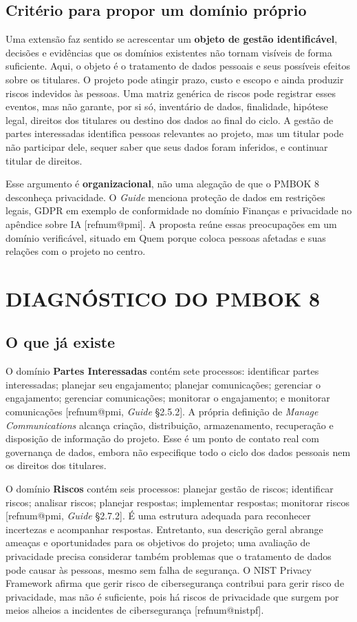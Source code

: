 \documentclass[12pt,a4paper,article,oneside,english,brazil]{abntex2}
\makeatletter
\newcommand{\refnum}[1]{\csname refnum@#1\endcsname}
\makeatother
\begin{document}
\subsection{Critério para propor um domínio próprio}

Uma extensão faz sentido se acrescentar um \textbf{objeto de gestão identificável}, decisões e evidências que os domínios existentes não tornam visíveis de forma suficiente. Aqui, o objeto é o tratamento de dados pessoais e seus possíveis efeitos sobre os titulares. O projeto pode atingir prazo, custo e escopo e ainda produzir riscos indevidos às pessoas. Uma matriz genérica de riscos pode registrar esses eventos, mas não garante, por si só, inventário de dados, finalidade, hipótese legal, direitos dos titulares ou destino dos dados ao final do ciclo. A gestão de partes interessadas identifica pessoas relevantes ao projeto, mas um titular pode não participar dele, sequer saber que seus dados foram inferidos, e continuar titular de direitos.

Esse argumento é \textbf{organizacional}, não uma alegação de que o PMBOK 8 desconheça privacidade. O \textit{Guide} menciona proteção de dados em restrições legais, GDPR em exemplo de conformidade no domínio Finanças e privacidade no apêndice sobre IA [\refnum{pmi}]. A proposta reúne essas preocupações em um domínio verificável, situado em Quem porque coloca pessoas afetadas e suas relações com o projeto no centro.

\section{DIAGNÓSTICO DO PMBOK 8}
\subsection{O que já existe}

O domínio \textbf{Partes Interessadas} contém sete processos: identificar partes interessadas; planejar seu engajamento; planejar comunicações; gerenciar o engajamento; gerenciar comunicações; monitorar o engajamento; e monitorar comunicações [\refnum{pmi}, \textit{Guide} §2.5.2]. A própria definição de \textit{Manage Communications} alcança criação, distribuição, armazenamento, recuperação e disposição de informação do projeto. Esse é um ponto de contato real com governança de dados, embora não especifique todo o ciclo dos dados pessoais nem os direitos dos titulares.

O domínio \textbf{Riscos} contém seis processos: planejar gestão de riscos; identificar riscos; analisar riscos; planejar respostas; implementar respostas; monitorar riscos [\refnum{pmi}, \textit{Guide} §2.7.2]. É uma estrutura adequada para reconhecer incertezas e acompanhar respostas. Entretanto, sua descrição geral abrange ameaças e oportunidades para os objetivos do projeto; uma avaliação de privacidade precisa considerar também problemas que o tratamento de dados pode causar às pessoas, mesmo sem falha de segurança. O NIST Privacy Framework afirma que gerir risco de cibersegurança contribui para gerir risco de privacidade, mas não é suficiente, pois há riscos de privacidade que surgem por meios alheios a incidentes de cibersegurança [\refnum{nistpf}].
\end{document}
